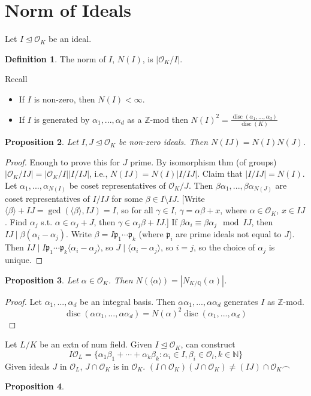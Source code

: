 \documentclass{article}
\theoremstyle{definition}
\newtheorem{defn}{Definition}[section]
\theoremstyle{remark}
\theoremstyle{plain}
\newtheorem{prop}[defn]{Proposition}
\newcommand{\NN}{\mathbb{N}}
\newcommand{\ZZ}{\mathbb{Z}}
\newcommand{\QQ}{\mathbb{Q}}
\newcommand{\disc}{\operatorname{disc}}
\begin{document}
\section{Norm of Ideals}
Let $I\trianglelefteq\mathcal O_K$ be an ideal. 
\begin{defn}
    The norm of $I$, $N(I)$, is $|\mathcal O_K/I|$.
\end{defn}
Recall\begin{itemize}
    \item If $I$ is non-zero, then $N(I)<\infty$.
    \item If $I$ is generated by $\alpha_1,...,\alpha_d$ as a $\ZZ$-mod then $N(I)^2=\frac{\disc(\alpha_1,...,\alpha_d)}{\disc(K)}$
\end{itemize}
\begin{prop}
    Let $I,J\trianglelefteq \mathcal O_K$ be non-zero ideals. Then $N(IJ)=N(I)N(J)$.
\end{prop}
\begin{proof}
    Enough to prove this for $J$ prime. By isomorphism thm (of groups) $|\mathcal O_K/IJ|=|\mathcal O_K/I||I/IJ|$, i.e., $N(IJ)=N(I)|I/IJ|$. Claim that $|I/IJ|=N(I)$. Let $\alpha_1,...,\alpha_{N(I)}$ be coset representatives of $\mathcal O_K/J$. Then $\beta\alpha_1,...,\beta\alpha_{N(J)}$ are coset representatives of $I/IJ$ for some $\beta\in I\setminus IJ$. [Write $\langle\beta\rangle + IJ=\gcd(\langle\beta\rangle,IJ)=I$, so for all $\gamma\in I$, $\gamma=\alpha\beta+x$, where $\alpha\in\mathcal O_K$, $x\in IJ$. Find $\alpha_j$ s.t. $\alpha\in\alpha_j+J$, then $\gamma\in\alpha_j\beta+IJ$.] If $\beta\alpha_i\equiv\beta\alpha_j\mod IJ$, then $IJ\mid \beta(\alpha_i-\alpha_j)$. Write $\beta=I\mathfrak p_1\cdots\mathfrak p_k$ (where $\mathfrak p_i$ are prime ideals not equal to $J$). Then $IJ\mid I\mathfrak p_1\cdots \mathfrak p_k\langle\alpha_i-\alpha_j\rangle$, so $J\mid \langle\alpha_i-\alpha_j\rangle$, so $i=j$, so the choice of $\alpha_j$ is unique.
\end{proof}
\begin{prop}
    Let $\alpha\in\mathcal O_K$. Then $N(\langle\alpha\rangle)=|N_{K/\QQ}(\alpha)|$.
\end{prop}
\begin{proof}
    Let $\alpha_1,...,\alpha_d$ be an integral basis. Then $\alpha\alpha_1,...,\alpha\alpha_d$ generates $I$ as $\ZZ$-mod.
    \[\disc(\alpha\alpha_1,...,\alpha\alpha_d)=N(\alpha)^2\disc(\alpha_1,...,\alpha_d)\]
\end{proof}

Let $L/K$ be an extn of num field.
Given $I\trianglelefteq\mathcal O_K$, can construct 
\[I\mathcal O_L=\{\alpha_1\beta_1+\cdots+\alpha_k\beta_k:\alpha_i\in I, \beta_i\in\mathcal O_l, k\in\NN\}\]
Given ideals $J$ in $\mathcal O_L$, $J\cap\mathcal O_K$ is in $\mathcal O_K$. 
\((I\cap\mathcal{O}_K)(J\cap\mathcal{O}_K)\neq(IJ)\cap\mathcal{O}_K\frown\)
\begin{prop}
    
\end{prop}
\end{document}
